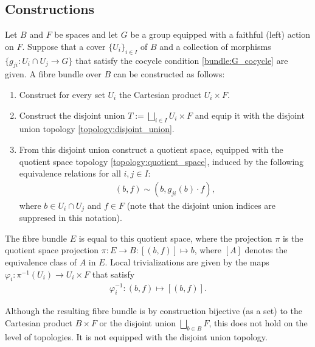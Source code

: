 
\subsection{Constructions}

    \begin{construct}\label{bundle:fibre_bundle_construction_theorem}
        Let $B$ and $F$ be spaces and let $G$ be a group equipped with a faithful (left) action on $F$. Suppose that a cover $\{U_i\}_{i\in I}$ of $B$ and a collection of morphisms $\{g_{ji}:U_i\cap U_j\rightarrow G\}$ that satisfy the cocycle condition \ref{bundle:G_cocycle} are given. A fibre bundle over $B$ can be constructed as follows:
        \begin{enumerate}
            \item Construct for every set $U_i$ the Cartesian product $U_i\times F$.
            \item Construct the disjoint union $T:=\bigsqcup_{i\in I}U_i\times F$ and equip it with the disjoint union topology \ref{topology:disjoint_union}.
            \item From this disjoint union construct a quotient space, equipped with the quotient space topology \ref{topology:quotient_space}, induced by the following equivalence relations for all $i,j\in I$:
                \begin{gather}
                    (b,f)\sim(b,g_{ji}(b)\cdot f),
                \end{gather}
                where $b\in U_i\cap U_j$ and $f\in F$ (note that the disjoint union indices are suppresed in this notation).
        \end{enumerate}
        The fibre bundle $E$ is equal to this quotient space, where the projection $\pi$ is the quotient space projection $\pi:E\rightarrow B:[(b,f)]\mapsto b$, where $[A]$ denotes the equivalence class of $A$ in $E$. Local trivializations are given by the maps $\varphi_i:\pi^{-1}(U_i)\rightarrow U_i\times F$ that satisfy
        \begin{gather}
            \varphi_i^{-1}:(b,f)\mapsto[(b,f)].
        \end{gather}
    \end{construct}
    \begin{remark}[Topology]
        Although the resulting fibre bundle is by construction bijective (as a set) to the Cartesian product $B\times F$ or the disjoint union $\bigsqcup_{b\in B}F$, this does not hold on the level of topologies. It is not equipped with the disjoint union topology.
    \end{remark}

